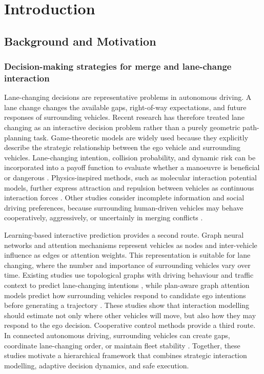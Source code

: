\begin{uomoriginality}
  \uomoriginalitydeclaration
\end{uomoriginality}
\uomcopyrightstatement

\uomstartmainbody

\section{Introduction}

\subsection{Background and Motivation}

\subsubsection{Decision-making strategies for merge and lane-change interaction}

Lane-changing decisions are representative problems in autonomous driving. A lane change changes the available gaps, right-of-way expectations, and future responses of surrounding vehicles. Recent research has therefore treated lane changing as an interactive decision problem rather than a purely geometric path-planning task. Game-theoretic models are widely used because they explicitly describe the strategic relationship between the ego vehicle and surrounding vehicles. Lane-changing intention, collision probability, and dynamic risk can be incorporated into a payoff function to evaluate whether a manoeuvre is beneficial or dangerous \cite{R1,R2}. Physics-inspired methods, such as molecular interaction potential models, further express attraction and repulsion between vehicles as continuous interaction forces \cite{R3}. Other studies consider incomplete information and social driving preferences, because surrounding human-driven vehicles may behave cooperatively, aggressively, or uncertainly in merging conflicts \cite{R4}.

Learning-based interactive prediction provides a second route. Graph neural networks and attention mechanisms represent vehicles as nodes and inter-vehicle influence as edges or attention weights. This representation is suitable for lane changing, where the number and importance of surrounding vehicles vary over time. Existing studies use topological graphs with driving behaviour and traffic context to predict lane-changing intentions \cite{R5}, while plan-aware graph attention models predict how surrounding vehicles respond to candidate ego intentions before generating a trajectory \cite{R6}. These studies show that interaction modelling should estimate not only where other vehicles will move, but also how they may respond to the ego decision. Cooperative control methods provide a third route. In connected autonomous driving, surrounding vehicles can create gaps, coordinate lane-changing order, or maintain fleet stability \cite{R7,R8}. Together, these studies motivate a hierarchical framework that combines strategic interaction modelling, adaptive decision dynamics, and safe execution.

